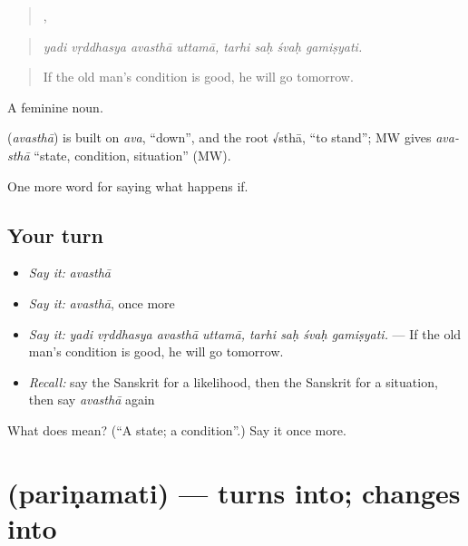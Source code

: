 \begin{quote}
   ,    
\end{quote}

\begin{quote}
\emph{yadi vṛddhasya avasthā uttamā, tarhi saḥ śvaḥ gamiṣyati.}
\end{quote}

\begin{quote}
If the old man's condition is good, he will go tomorrow.
\end{quote}

A feminine noun.

\begin{cousinweb}
\textbf{} (\emph{avasthā}) is built on \emph{ava}, \textquotedblleft{}down\textquotedblright{}, and the root √sthā, \textquotedblleft{}to stand\textquotedblright{}; MW gives \emph{ava-sthā} \textquotedblleft{}state, condition, situation\textquotedblright{} (MW).
\end{cousinweb}

\begin{grammarlens}[title={What you've built}]
One more word for saying what happens if.
\end{grammarlens}

\subsection*{Your turn}
\begin{itemize}
\raggedright
  \item \emph{Say it:} \emph{avasthā}
  \item \emph{Say it:} \emph{avasthā}, once more
  \item \emph{Say it:} \emph{yadi vṛddhasya avasthā uttamā, tarhi saḥ śvaḥ gamiṣyati.} — If the old man's condition is good, he will go tomorrow.
  \item \emph{Recall:} say the Sanskrit for a likelihood, then the Sanskrit for a situation, then say \emph{avasthā} again
\end{itemize}

\begin{tcolorbox}[breakable,colback=teal!4,colframe=teal!35!black,title={Before you move on}]
What does  mean? (\textquotedblleft{}A state; a condition\textquotedblright{}.) Say it once more.
\end{tcolorbox}
\section[\texorpdfstring{\sk{परिणमति} (pariṇamati)}{परिणमति (pariṇamati)}]{ (pariṇamati) — turns into; changes into}


